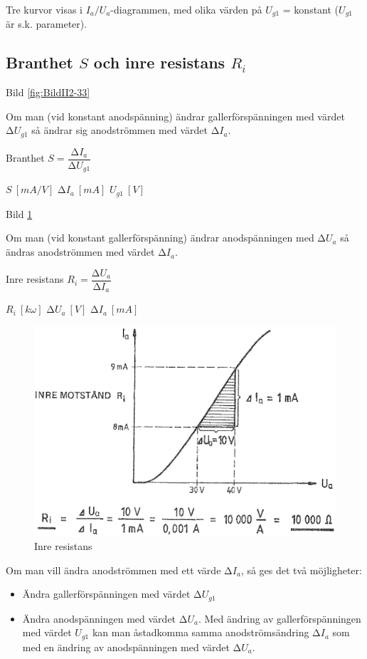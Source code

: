 Tre kurvor visas i \(I_a/U_a\)-diagrammen, med olika värden på
\(U_{g1}\) = konstant (\(U_{g1}\) är s.k. parameter).

\subsection{Branthet \(S\) och inre resistans \(R_i\)}

Bild \ref{fig:BildII2-33}

Om man (vid konstant anodspänning) ändrar gallerförspänningen med värdet
\(∆U_{g1}\) så ändrar sig anodströmmen med värdet \(∆I_a\).

Branthet \(S = \dfrac{∆I_a}{∆U_{g1}}\)

\(S\ [mA/V]\) \(∆I_a\ [mA]\) \(U_{g1}\ [V]\)

Bild \ref{fig:BildII2-34}

Om man (vid konstant gallerförspänning) ändrar anodspänningen med
\(∆U_a\) så ändras anodströmmen med värdet \(∆I_a\).

Inre resistans \(R_i = \dfrac{∆U_a}{∆I_a}\)

\(R_i\ [k \omega]\)  \(∆U_a\ [V]\)  \(∆I_a\ [mA]\)

\begin{figure}[h]
\includegraphics[width=\textwidth]{images/bild_2_2-34.png}
\caption{Inre resistans}
\label{fig:BildII2-34}
\end{figure}

Om man vill ändra anodströmmen med ett värde \(∆I_a\), så ges det två
möjligheter:
\begin{itemize}
\item Ändra gallerförspänningen med värdet \(∆U_{g1}\)
\item Ändra anodspänningen med värdet \(∆U_a\).
  Med ändring av gallerförspänningen med värdet \(U_{g1}\) kan man åstadkomma
  samma anodströmsändring \(∆I_a\) som med en ändring av anodspänningen med
  värdet \(∆U_a\).
\end{itemize}

